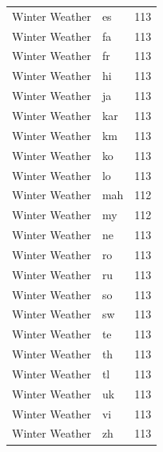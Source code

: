 \begin{longtable}{p{3cm} p{3cm} r}
Winter Weather & es & 113 \\
Winter Weather & fa & 113 \\
Winter Weather & fr & 113 \\
Winter Weather & hi & 113 \\
Winter Weather & ja & 113 \\
Winter Weather & kar & 113 \\
Winter Weather & km & 113 \\
Winter Weather & ko & 113 \\
Winter Weather & lo & 113 \\
Winter Weather & mah & 112 \\
Winter Weather & my & 112 \\
Winter Weather & ne & 113 \\
Winter Weather & ro & 113 \\
Winter Weather & ru & 113 \\
Winter Weather & so & 113 \\
Winter Weather & sw & 113 \\
Winter Weather & te & 113 \\
Winter Weather & th & 113 \\
Winter Weather & tl & 113 \\
Winter Weather & uk & 113 \\
Winter Weather & vi & 113 \\
Winter Weather & zh & 113 \\
\end{longtable}